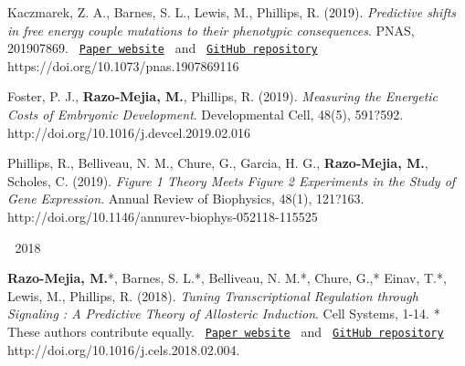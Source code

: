 \begin{cventries}
{\begin{cvitems}
{\begin{flushleft}
          Kaczmarek, Z. A., Barnes, S. L., Lewis, M., Phillips, R. (2019).
          \textit{Predictive shifts in free energy couple mutations to their
          phenotypic consequences}. PNAS, 201907869.
          \texttt{
          \href{https://www.rpgroup.caltech.edu/mwc_mutants/}{Paper website} 
          }
          and
          \texttt{
          \href{https://github.com/RPGroup-PBoC/mwc_mutants}{GitHub repository}
          }
          \linebreak
          https://doi.org/10.1073/pnas.1907869116
        \end{flushleft}
        }
        \item {
          \begin{flushleft}
            Foster, P. J., \textbf{Razo-Mejia, M.}, Phillips, R. (2019).
            \textit{Measuring the Energetic Costs of Embryonic Development}.
            Developmental Cell, 48(5), 591?592.\linebreak
            http://doi.org/10.1016/j.devcel.2019.02.016
          \end{flushleft}
        }
        \item {
          \begin{flushleft}
            Phillips, R., Belliveau, N. M., Chure, G., Garcia, H. G.,
            \textbf{Razo-Mejia, M.}, Scholes, C. (2019). \textit{Figure 1
            Theory Meets Figure 2 Experiments in the Study of Gene Expression}.
            Annual Review of Biophysics, 48(1), 121?163.\linebreak
            http://doi.org/10.1146/annurev-biophys-052118-115525
          \end{flushleft}
        }
      \end{cvitems}
    }

\cventry
    {$\;$}
    {2018}
    {$\;$}
    {$\;$}
    {
      \begin{cvitems}
        \item {
        \begin{flushleft}
          \textbf{Razo-Mejia, M.}*, Barnes, S. L.*, Belliveau, N. M.*, Chure,
          G.,* Einav, T.*, Lewis, M., Phillips, R. (2018). \textit{Tuning
          Transcriptional Regulation through Signaling : A Predictive Theory of
          Allosteric Induction}. Cell Systems, 1-14. * These authors contribute
          equally. 
          \texttt{
            \href{http://www.rpgroup.caltech.edu/mwc_induction/}{Paper website} 
            }
            and
            \texttt{
            \href{http://www.github.com/rpgroup-pboc/mwc_induction}{GitHub repository}
            }
          \linebreak
          http://doi.org/10.1016/j.cels.2018.02.004.
        \end{flushleft}
        }
      \end{cvitems}
    }


\end{cventries}

